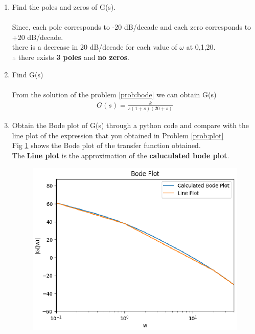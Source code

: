\begin{enumerate}[label=\thesubsection.\arabic*.,ref=\thesubsection.\theenumi]
\item Find the poles and zeros of G(s).
\label{prob:bode} \\
\solution \\
Since, each pole corresponds to -20 dB/decade  
and each zero corresponds to +20 dB/decade.\\
there is a decrease in 20 dB/decade for each value of $\omega$ at 0,1,20.\\
$\therefore$ there exists \textbf{3 poles} and \textbf{no zeros}.

\item Find G(s) \\
\solution \\
From the solution of the problem \ref{prob:bode} we can obtain G(s)
\begin{align}
	G(s) = \frac{k}{s(1+s)(20+s)}
\end{align}

\item Obtain the Bode plot of G(s) through a python code and compare with the line plot of the expression that you obtained in Problem \ref{prob:plot} \\
\solution 
Fig \ref{fig:line_plot} shows the Bode plot of the transfer function obtained.\\
 The \textbf{Line plot} is the approximation of the \textbf{caluculated bode plot}. 
\begin{figure}[htp]
	\centering
	\includegraphics[width=1 \columnwidth]{./figs/ee18btech11009/plt.eps}
	\caption{}
	\label{fig:line_plot}
\end{figure} 



\end{enumerate}
